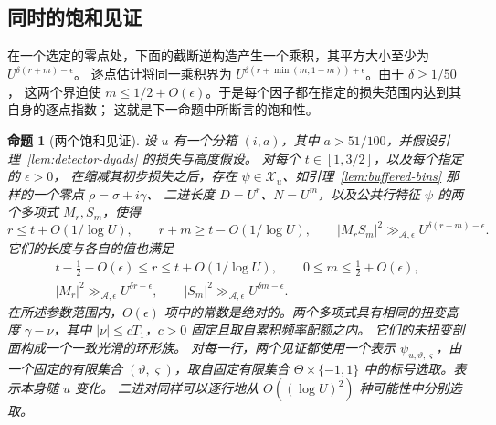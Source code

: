 \documentclass[11pt,a4paper]{article}
\numberwithin{equation}{section}
\numberwithin{figure}{section}
\newtheorem{proposition}[theorem]{命题}
\theoremstyle{definition}
\theoremstyle{remark}
\begin{document}
\subsection{同时的饱和见证}

在一个选定的零点处，下面的截断逆构造产生一个乘积，其平方大小至少为 $U^{\delta(r+m)-\epsilon}$。
逐点估计将同一乘积界为 $U^{\delta(r+\min(m,1-m))+\epsilon}$。由于 $\delta\ge1/50$，
这两个界迫使 $m\le1/2+O(\epsilon)$。于是每个因子都在指定的损失范围内达到其自身的逐点指数；
这就是下一命题中所断言的饱和性。

\begin{proposition}[两个饱和见证]\label{prop:detector-witness}
设 \(u\) 有一个分箱 \((i,a)\)，其中 \(a>51/100\)，并假设引理~\ref{lem:detector-dyads} 的损失与高度假设。
对每个 \(t\in[1,3/2]\)，以及每个指定的 \(\epsilon>0\)，
在缩减其初步损失之后，存在
\(\psi\in\mathcal X_u\)、如引理~\ref{lem:buffered-bins} 那样的一个零点 \(\rho=\sigma+i\gamma\)、
二进长度 \(D=U^r\)、\(N=U^m\)，以及公共行特征 \(\psi\) 的两个多项式 \(M_r,S_m\)，使得
\begin{equation}\label{eq:detector-note}
 r\le t+O(1/\log U),\qquad
 r+m\ge t-O(1/\log U),\qquad
 |M_rS_m|^2\gg_{\mathcal A,\epsilon}
 U^{\delta(r+m)-\epsilon}.
\end{equation}
它们的长度与各自的值也满足
\begin{equation}\label{eq:saturated-witness}
 \begin{gathered}
 t-\tfrac12-O(\epsilon)\le r\le t+O(1/\log U),
 \qquad 0\le m\le\tfrac12+O(\epsilon),\\
 |M_r|^2\gg_{\mathcal A,\epsilon}U^{\delta r-\epsilon},
 \qquad
 |S_m|^2\gg_{\mathcal A,\epsilon}U^{\delta m-\epsilon}.
 \end{gathered}
\end{equation}
在所述参数范围内，\(O(\epsilon)\) 项中的常数是绝对的。两个多项式具有相同的扭变高度
\(\gamma-\nu\)，其中 \(|\nu|\le cT_1\)，\(c>0\) 固定且取自累积频率配额之内。
它们的未扭变剖面构成一个一致光滑的环形族。
对每一行，两个见证都使用一个表示 \(\psi_{u,\vartheta,\varsigma}\)，由一个固定的有限集合
\((\vartheta,\varsigma)\)，取自固定有限集合
\(\Theta\times\{-1,1\}\) 中的标号选取。表示本身随 \(u\) 变化。
二进对同样可以逐行地从 \(O((\log U)^2)\) 种可能性中分别选取。
\end{proposition}
\end{document}
